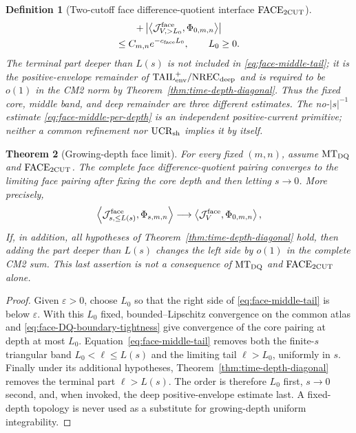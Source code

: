 \documentclass[11pt]{article}
\newtheorem{theorem}{Theorem}[section]
\newtheorem{definition}[theorem]{Definition}
\begin{document}
\begin{definition}[Two-cutoff face difference-quotient interface
$\mathrm{FACE}_{\rm 2CUT}$]
\begin{multline}
 +\left|\left\langle
 \mathcal J_{V,>L_0}^{\rm face},\Phi_{0,m,n}
 \right\rangle\right|\\
 \le C_{m,n}e^{-c_{\rm face}L_0},\qquad L_0\ge0.
\end{multline}
The terminal part deeper than $L(s)$ is not included in
\eqref{eq:face-middle-tail}; it is the positive-envelope remainder of
$\mathrm{TAIL}_{\rm env}^{+}/\mathrm{NREC}_{\rm deep}$ and is required to
be $o(1)$ in the CM2 norm by
Theorem~\ref{thm:time-depth-diagonal}.  Thus the fixed core, middle band, and
deep remainder are three different estimates.  The no-$|s|^{-1}$ estimate
\eqref{eq:face-middle-per-depth} is an independent positive-current
primitive; neither a common refinement nor $\mathrm{UCR}_{\rm sh}$ implies
it by itself.
\end{definition}

\begin{theorem}[Growing-depth face limit]
\label{thm:face-two-cutoff}
For every fixed $(m,n)$, assume $\mathrm{MT}_{\rm DQ}$ and
$\mathrm{FACE}_{\rm 2CUT}$.  The complete face difference-quotient pairing
converges to the limiting face pairing after fixing the core depth and then
letting $s\to0$.  More precisely,
\begin{equation}
\label{eq:face-growing-depth-convergence}
 \left\langle\mathcal J_{s,\le L(s)}^{\rm face},
       \Phi_{s,m,n}\right\rangle
 \longrightarrow
\left\langle\mathcal J_{V}^{\rm face},
       \Phi_{0,m,n}\right\rangle,
\end{equation}
If, in addition, all hypotheses of
Theorem~\ref{thm:time-depth-diagonal} hold, then adding the part deeper than
$L(s)$ changes the left side by $o(1)$ in the complete CM2 sum.  This last
assertion is not a consequence of $\mathrm{MT}_{\rm DQ}$ and
$\mathrm{FACE}_{\rm 2CUT}$ alone.
\end{theorem}

\begin{proof}
Given $\varepsilon>0$, choose $L_0$ so that the right side of
\eqref{eq:face-middle-tail} is below $\varepsilon$.  With this $L_0$ fixed,
bounded--Lipschitz convergence on the common atlas and
\eqref{eq:face-DQ-boundary-tightness} give convergence of the core pairing
at depth at most $L_0$.  Equation~\eqref{eq:face-middle-tail} removes both
the finite-$s$ triangular band $L_0<\ell\le L(s)$ and the limiting tail
$\ell>L_0$, uniformly in $s$.  Finally
under its additional hypotheses,
Theorem~\ref{thm:time-depth-diagonal} removes the terminal part
$\ell>L(s)$.  The order is therefore $L_0$ first, $s\to0$ second, and,
when invoked, the deep positive-envelope estimate last.  A fixed-depth topology is never used
as a substitute for growing-depth uniform integrability.
\end{proof}
\end{document}
